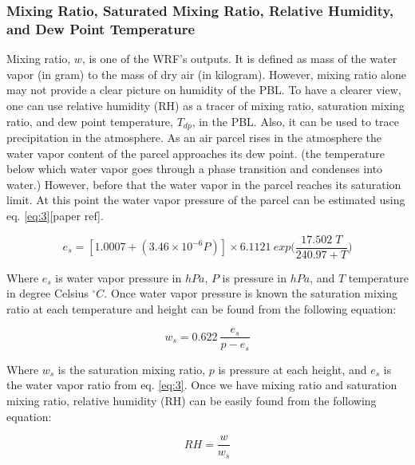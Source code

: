 \documentclass[a4paper,12pt]{article}
\numberwithin{equation}{section} %
\begin{document}
\subsubsection{Mixing Ratio, Saturated Mixing Ratio, Relative Humidity, and Dew Point Temperature}

Mixing ratio, $w$, is one of the WRF's outputs. It is defined as mass of the water vapor (in gram) to the mass of dry air (in kilogram). However, mixing ratio alone may not provide a clear picture on humidity of the PBL. To have a clearer view, one can use relative humidity (RH) as a tracer of mixing ratio, saturation mixing ratio, and dew point temperature, $T_{dp}$, in the PBL. Also, it can be used to trace precipitation in the atmosphere. As an air parcel rises in the atmosphere the water vapor content of the parcel approaches its dew point. (the temperature below which water vapor goes through a phase transition and condenses into water.) However, before that the water vapor in the parcel reaches its saturation limit. %
At this point the water vapor pressure of the parcel can be estimated using eq. \ref{eq:3}[paper ref]. 

\vspace{0.25cm}
\begin{equation}\label{eq:3}
e_s = [1.0007 + (3.46 \times 10^{-6} P)] \times 6.1121 \: exp\Big(\frac{17.502\; T}{240.97 + T}\Big)
\end{equation}
\vspace{0.25cm}

Where $e_s$ is water vapor pressure in $hPa$, $P$ is pressure in $hPa$, and $T$ temperature in degree Celsius $^\circ C$.
Once water vapor pressure is known the saturation mixing ratio at each temperature and height can be found from the following equation:

\vspace{0.25cm}
\begin{equation}\label{eq:4}
w_s = 0.622 \: \frac{e_s}{p - e_s}
\end{equation}
\vspace{0.25cm}

Where $w_s$ is the saturation mixing ratio, $p$ is pressure at each height, and $e_s$ is the water vapor ratio from eq. \ref{eq:3}. Once we have mixing ratio and saturation mixing ratio, relative humidity (RH) can be easily found from the following equation:

\vspace{0.25cm}
\begin{equation}\label{eq:5}
RH=\frac{w}{w_s}
\end{equation}
\vspace{0.25cm}
\end{document}
